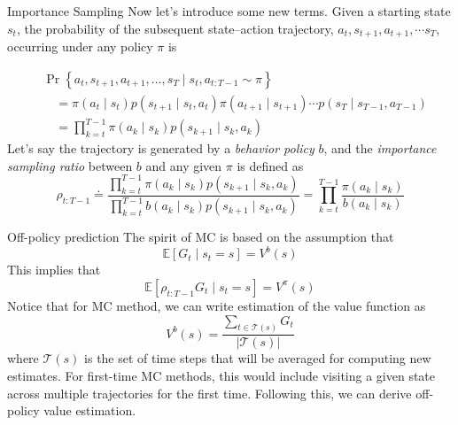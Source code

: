 \documentclass[handout]{beamer}
\begin{document}
\begin{frame}{Importance Sampling}
\small
Now let's introduce some new terms. Given a starting state $s_t$, the probability of the subsequent state–action trajectory, $a_t, s_{t+1}, a_{t+1}, \cdots s_{T}$, occurring under any policy $\pi$ is

\begin{equation*}
\begin{aligned}
&\operatorname{Pr}\left\{a_{t}, s_{t+1}, a_{t+1}, \ldots, s_{T} \mid s_{t}, a_{t: T-1} \sim \pi\right\} \\
&\quad =\pi\left(a_{t} \mid s_{t}\right) p\left(s_{t+1} \mid s_{t}, a_{t}\right) \pi\left(a_{t+1} \mid s_{t+1}\right) \cdots p\left(s_{T} \mid s_{T-1}, a_{T-1}\right) \\
&\quad =\prod_{k=t}^{T-1} \pi\left(a_{k} \mid s_{k}\right) p\left(s_{k+1} \mid s_{k}, a_{k}\right)
\end{aligned}
\end{equation*}
Let's say the trajectory is generated by a \textit{behavior policy} $b$, and the \textit{importance sampling ratio} between $b$ and any given $\pi$ is defined as 
\begin{equation*}
\rho_{t: T-1} \doteq \frac{\prod_{k=t}^{T-1} \pi\left(a_{k} \mid s_{k}\right) p\left(s_{k+1} \mid s_{k}, a_{k}\right)}{\prod_{k=t}^{T-1} b\left(a_{k} \mid s_{k}\right) p\left(s_{k+1} \mid s_{k}, a_{k}\right)}=\prod_{k=t}^{T-1} \frac{\pi\left(a_{k} \mid s_{k}\right)}{b\left(a_{k} \mid s_{k}\right)}
\end{equation*}
\end{frame}

\begin{frame}{Off-policy prediction}
\small
The spirit of MC is based on the assumption that $$\mathbb{E}\left[G_t\mid s_t = s\right] = V^b(s)$$ This implies that $$\mathbb{E}\left[\rho_{t:T-1} G_t\mid s_t = s\right] = V^{\pi}(s)$$
Notice that for MC method, we can write estimation of the value function as 
$$
V^b(s) = \frac{\sum_{t\in\mathcal{T}(s)}G_t}{|\mathcal{T}(s)|}
$$
where $\mathcal{T}(s)$ is the set of time steps that will be averaged for computing new estimates. For first-time MC methods, this would include visiting a given state across multiple trajectories for the first time. Following this, we can derive off-policy value estimation.
\end{frame}
\end{document}
